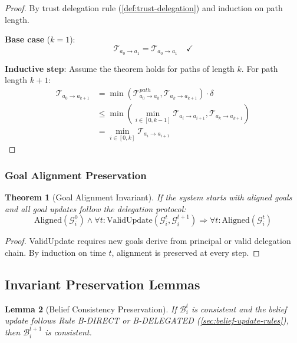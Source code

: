 \documentclass[
]{article}
\newtheorem{theorem}{Theorem}[section]
\newtheorem{lemma}[theorem]{Lemma}
\begin{document}
\begin{proof}
By trust delegation rule (\cref{def:trust-delegation}) and induction on path length.

\textbf{Base case} ($k=1$):
\begin{equation}
\label{eq:trust-base}
\mathcal{T}_{a_0 \to a_1} = \mathcal{T}_{a_0 \to a_1} \quad \checkmark
\end{equation}

\textbf{Inductive step}: Assume the theorem holds for paths of length $k$. For path length $k+1$:
\begin{align}
\label{eq:trust-induction}
\mathcal{T}_{a_0 \to a_{k+1}} &= \min(\mathcal{T}_{a_0 \to a_k}^{path}, \mathcal{T}_{a_k \to a_{k+1}}) \cdot \delta \\
&\leq \min(\min_{i \in [0,k-1]} \mathcal{T}_{a_i \to a_{i+1}}, \mathcal{T}_{a_k \to a_{k+1}}) \nonumber \\
&= \min_{i \in [0,k]} \mathcal{T}_{a_i \to a_{i+1}} \nonumber
\end{align}
\end{proof}

\subsubsection{Goal Alignment
Preservation}\label{sec:goal-alignment-proof}

\begin{theorem}[Goal Alignment Invariant]
\label{thm:goal-alignment}
If the system starts with aligned goals and all goal updates follow the delegation protocol:
\begin{equation}
\label{eq:goal-alignment-invariant}
\text{Aligned}(\mathcal{G}_i^0) \land \forall t: \text{ValidUpdate}(\mathcal{G}_i^t, \mathcal{G}_i^{t+1}) \Rightarrow \forall t: \text{Aligned}(\mathcal{G}_i^t)
\end{equation}
\end{theorem}

\begin{proof}
ValidUpdate requires new goals derive from principal or valid delegation chain. By induction on time $t$, alignment is preserved at every step.
\end{proof}

\subsection{Invariant Preservation Lemmas}\label{sec:invariant-lemmas}

\begin{lemma}[Belief Consistency Preservation]
\label{lem:belief-consistency}
If $\mathcal{B}_i^t$ is consistent and the belief update follows Rule B-DIRECT or B-DELEGATED (\cref{sec:belief-update-rules}), then $\mathcal{B}_i^{t+1}$ is consistent.
\end{lemma}
\end{document}
